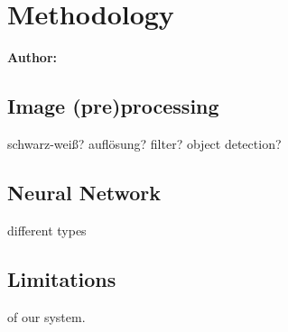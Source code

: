 \chapter{Methodology}

\textbf{Author: } 

\section{Image (pre)processing}
schwarz-weiß?
auflösung?
filter?
object detection?

\section{Neural Network}
different types

\section{Limitations}
of our system.

\filbreak